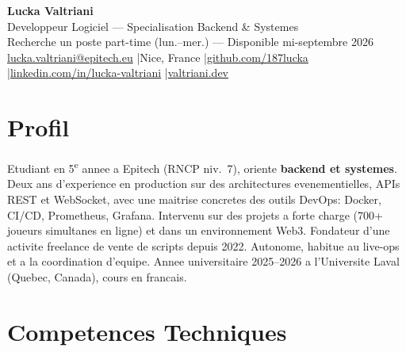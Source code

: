 \documentclass[10pt,a4paper]{article}
\newcommand{\myphone}{}
\begin{document}
\begin{center}
  {\LARGE\bfseries\color{accent} Lucka Valtriani}\\[5pt]
  {\normalsize\color{gray} Developpeur Logiciel --- Specialisation Backend \& Systemes}\\[2pt]
  {\small\color{gray} Recherche un poste part-time (lun.--mer.) --- Disponible mi-septembre 2026}\\[7pt]
  {\small
    \myphone\href{mailto:lucka.valtriani@epitech.eu}{lucka.valtriani@epitech.eu}
    \quad|\quad Nice, France
    \quad|\quad \href{https://github.com/187lucka}{github.com/187lucka}
    \quad|\quad \href{https://www.linkedin.com/in/lucka-valtriani-8a8551258/}{linkedin.com/in/lucka-valtriani}
    \quad|\quad \href{https://valtriani.dev}{valtriani.dev}
  }
\end{center}

\vspace{2pt}

\section{Profil}

{\small
Etudiant en 5\textsuperscript{e} annee a Epitech (RNCP niv.~7), oriente \textbf{backend et systemes}. Deux ans d'experience en production sur des architectures evenementielles, APIs REST et WebSocket, avec une maitrise concretes des outils DevOps: Docker, CI/CD, Prometheus, Grafana. Intervenu sur des projets a forte charge (700+ joueurs simultanes en ligne) et dans un environnement Web3. Fondateur d'une activite freelance de vente de scripts depuis 2022. Autonome, habitue au live-ops et a la coordination d'equipe. Annee universitaire 2025--2026 a l'Universite Laval (Quebec, Canada), cours en francais.
}

\section{Competences Techniques}
\end{document}
